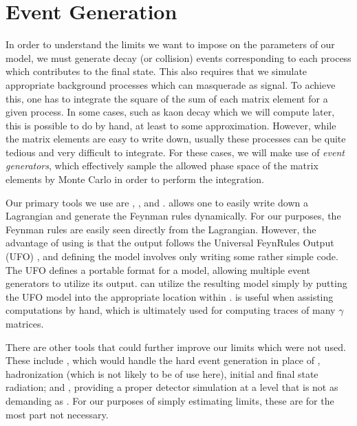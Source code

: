 \section{Event Generation}

In order to understand the limits we want to impose on the parameters of our model, we must generate decay (or collision) events corresponding to each process which contributes to the final state.
This also requires that we simulate appropriate background processes which can masquerade as signal.
To achieve this, one has to integrate the square of the sum of each matrix element for a given process.
In some cases, such as kaon decay which we will compute later, this is possible to do by hand, at least to some approximation.
However, while the matrix elements are easy to write down, usually these processes can be quite tedious and very difficult to integrate.
For these cases, we will make use of \emph{event generators}, which effectively sample the allowed phase space of the matrix elements by Monte Carlo in order to perform the integration.

Our primary tools we use are \feynrules \cite{Alloul:2013bka}, \feyncalc \cite{Mertig:1990an}, and \mgamcnlo \cite{Alwall:2011uj,Alwall:2014hca}.
\feynrules allows one to easily write down a Lagrangian and generate the Feynman rules dynamically.
For our purposes, the Feynman rules are easily seen directly from the Lagrangian.
However, the advantage of using \feynrules is that the output follows the Universal FeynRules Output (UFO) \cite{Degrande:2011ua}, and defining the model involves only writing some rather simple \mathematica code.
The UFO defines a portable format for a model, allowing multiple event generators to utilize its output.
\madgraph can utilize the resulting model simply by putting the UFO model into the appropriate location within \madgraph.
\feyncalc is useful when assisting computations by hand, which is ultimately used for computing traces of many $\gamma$ matrices.

There are other tools that could further improve our limits which were not used.
These include \pythia \cite{Sjostrand:2007gs}, which would handle the hard event generation in place of \madgraph, hadronization (which is not likely to be of use here), initial and final state radiation; and \delphes \cite{Selvaggi:2014mya}, providing a proper detector simulation at a level that is not as demanding as \geant \cite{Agostinelli:2002hh}. For our purposes of simply estimating limits, these are for the most part not necessary.

